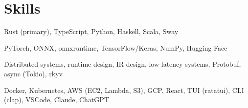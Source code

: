 \section{Skills}

%
{}%
{}%
{\small Rust (primary), TypeScript, Python, Haskell, Scala, Sway \normalsize}%
{}

%
{}%
{}%
{\small PyTorch, ONNX, onnxruntime, TensorFlow/Keras, NumPy, Hugging Face \normalsize}%
{}

%
{}%
{}%
{\small Distributed systems, runtime design, IR design, low-latency systems, Protobuf, async (Tokio), rkyv \normalsize}%
{}

%
{}%
{}%
{\small Docker, Kubernetes, AWS (EC2, Lambda, S3), GCP, React, TUI (ratatui), CLI (clap), VSCode, Claude, ChatGPT \normalsize}%
{}
